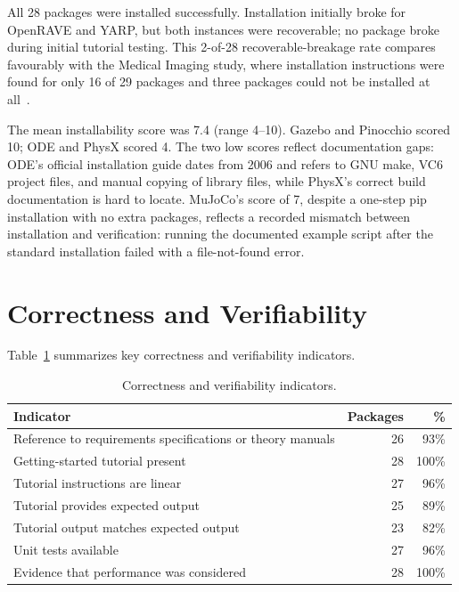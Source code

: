 All 28 packages were installed successfully. Installation initially broke for OpenRAVE and YARP, but both instances were recoverable; no package broke during initial tutorial testing. This 2-of-28 recoverable-breakage rate compares favourably with the Medical Imaging study, where installation instructions were found for only 16 of 29 packages and three packages could not be installed at all~\citep{Smith2024MI}.

The mean installability score was 7.4 (range 4--10). Gazebo and Pinocchio scored 10; ODE and PhysX scored 4. The two low scores reflect documentation gaps: ODE's official installation guide dates from 2006 and refers to GNU make, VC6 project files, and manual copying of library files, while PhysX's correct build documentation is hard to locate. MuJoCo's score of 7, despite a one-step pip installation with no extra packages, reflects a recorded mismatch between installation and verification: running the documented example script after the standard installation failed with a file-not-found error.

\section{Correctness and Verifiability}
\label{sec:correctness-verifiability-results}

Table~\ref{tab:correctness-summary} summarizes key correctness and verifiability indicators.

\begin{table}[H]
\centering
\caption{Correctness and verifiability indicators.}
\label{tab:correctness-summary}
\begin{tabular}{@{}lrr@{}}
\toprule
\textbf{Indicator} & \textbf{Packages} & \textbf{\%} \\
\midrule
Reference to requirements specifications or theory manuals & 26 & 93\% \\
Getting-started tutorial present & 28 & 100\% \\
Tutorial instructions are linear & 27 & 96\% \\
Tutorial provides expected output & 25 & 89\% \\
Tutorial output matches expected output & 23 & 82\% \\
Unit tests available & 27 & 96\% \\
Evidence that performance was considered & 28 & 100\% \\
\bottomrule
\end{tabular}
\end{table}

